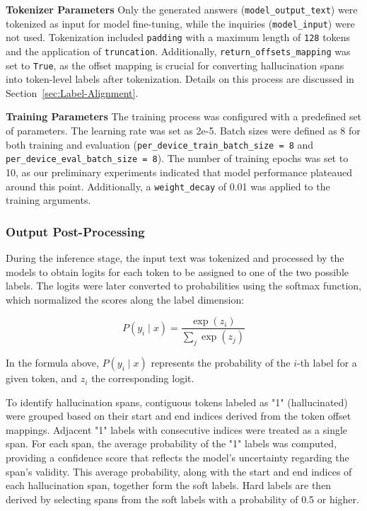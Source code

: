 \documentclass[11pt]{article}
\begin{document}
\textbf{Tokenizer Parameters}  
Only the generated answers (\texttt{model\_output\_text}) were tokenized as input for model fine-tuning, while the inquiries (\texttt{model\_input}) were not used. Tokenization included \texttt{padding} with a maximum length of \texttt{128} tokens and the application of \texttt{truncation}. Additionally, \texttt{return\_offsets\_mapping} was set to \texttt{True}, as the offset mapping is crucial for converting hallucination spans into token-level labels after tokenization. Details on this process are discussed in Section~\ref{sec:Label-Alignment}.


\textbf{Training Parameters}
The training process was configured with a predefined set of parameters. The learning rate was set as 2e-5. Batch sizes were defined as 8 for both training and evaluation (\texttt{per\_device\_train\_batch\_size = 8} and \texttt{per\_device\_eval\_batch\_size = 8}). The number of training epochs was set to 10, as our preliminary experiments indicated that model performance plateaued around this point. Additionally, a \texttt{weight\_decay} of 0.01 was applied to the training arguments.


\subsubsection{Output Post-Processing}
During the inference stage, the input text was tokenized and processed by the models to obtain logits for each token to be assigned to one of the two possible labels. The logits were later converted to probabilities using the softmax function, which normalized the scores along the label dimension:

\[
P(y_i \mid x) = \frac{\exp(z_i)}{\sum_{j} \exp(z_j)}
\]

In the formula above, $P(y_i \mid x)$ represents the probability of the $i$-th label for a given token, and $z_i$ the corresponding logit.

To identify hallucination spans, contiguous tokens labeled as "1" (hallucinated) were grouped based on their start and end indices derived from the token offset mappings. Adjacent "1" labels with consecutive indices were treated as a single span. For each span, the average probability of the "1" labels was computed, providing a confidence score that reflects the model's uncertainty regarding the span's validity. This average probability, along with the start and end indices of each hallucination span, together form the soft labels. Hard labels are then derived by selecting spans from the soft labels with a probability of 0.5 or higher.
   
\end{document}
